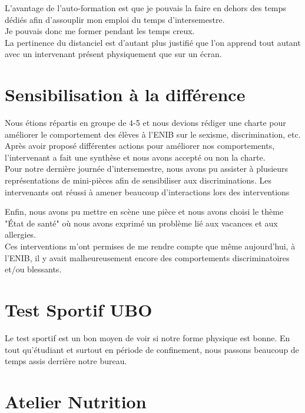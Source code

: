L'avantage de l'auto-formation est que je pouvais la faire en dehors des temps dédiés afin d'assouplir mon emploi du temps d'intersemestre. \\Je pouvais donc me former pendant les temps creux. \\

La pertinence du distanciel est d'autant plus justifié que l'on apprend tout autant avec un intervenant présent physiquement que sur un écran.


\section{Sensibilisation à la différence}

Nous étions répartis en groupe de 4-5 et nous devions rédiger une charte pour améliorer le comportement des élèves à l'ENIB sur le sexisme, discrimination, etc.\\

Après avoir proposé différentes actions pour améliorer nos comportements, l'intervenant a fait une synthèse et nous avons accepté ou non la charte.\\

Pour notre dernière journée d'intersemestre, nous avons pu assister à plusieurs représentations de mini-pièces afin de sensibiliser aux discriminations. Les intervenants ont réussi à amener beaucoup d'interactions lors des interventions

Enfin, nous avons pu mettre en scène une pièce et nous avons choisi le thème "État de santé" où nous avons exprimé un problème lié aux vacances et aux allergies.\\

Ces interventions m'ont permises de me rendre compte que même aujourd'hui, à l'ENIB, il y avait malheureusement encore des comportements discriminatoires et/ou blessants.


\section{Test Sportif UBO}

Le test sportif est un bon moyen de voir si notre forme physique est bonne. En tout qu'étudiant et surtout en période de confinement, nous passons beaucoup de temps assis derrière notre bureau.

\section{Atelier Nutrition}


